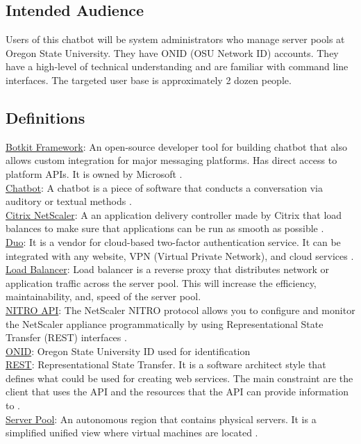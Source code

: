 \documentclass[onecolumn, draftclsnofoot,10pt, compsoc]{IEEEtran}
\begin{document}
\subsection{Intended Audience}
Users of this chatbot will be system administrators who manage server pools at Oregon State University. They have ONID (OSU Network ID) accounts.
They have a high-level of technical understanding and are familiar with command line interfaces.
The targeted user base is approximately 2 dozen people.

\subsection{Definitions}
\underline{Botkit Framework}: An open-source developer tool for building chatbot that also allows custom integration for major messaging platforms. Has direct access to platform APIs. It is owned by Microsoft \cite{framework}.
\\\underline{Chatbot}: A chatbot is a piece of software that conducts a conversation via auditory or textual methods \cite{chatbot}.
\\\underline{Citrix NetScaler}: A an application delivery controller made by Citrix that load balances to make sure that applications can be run as smooth as possible \cite{netscaler}.
\\\underline{Duo}: It is a vendor for cloud-based two-factor authentication service. It can be integrated with any website, VPN (Virtual Private Network), and cloud services \cite{duo}.
\\\underline{Load Balancer}: Load balancer is a reverse proxy that distributes network or application traffic across the server pool. This will increase the efficiency, maintainability, and, speed of the server pool. 
\\\underline{NITRO API}: The NetScaler NITRO protocol allows you to configure and monitor the NetScaler appliance programmatically by using Representational State Transfer (REST) interfaces \cite{citrixnitro}.
\\\underline{ONID}: Oregon State University ID used for identification
\\\underline{REST}: Representational State Transfer. It is a software architect style that defines what could be used for creating web services. The main constraint are the client that uses the API and the resources that the API can provide information to \cite{restphd} \cite{rest}.  
\\\underline{Server Pool}: An autonomous region that contains physical servers. It is a simplified unified view where virtual machines are located \cite{pools}.
\end{document}
